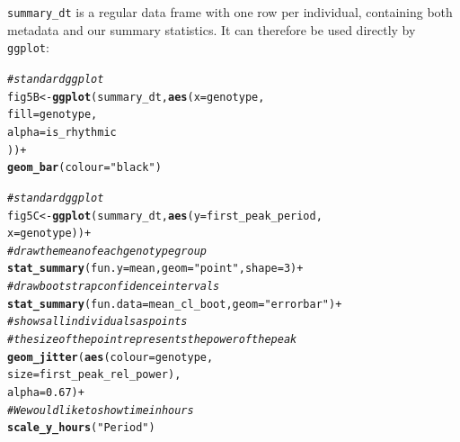 \documentclass[10pt,letterpaper]{article}\usepackage[]{graphicx}\usepackage[]{color}
\makeatletter
\newcommand{\hlnum}[1]{\textcolor[rgb]{0.686,0.059,0.569}{#1}}%
\newcommand{\hlstr}[1]{\textcolor[rgb]{0.192,0.494,0.8}{#1}}%
\newcommand{\hlcom}[1]{\textcolor[rgb]{0.678,0.584,0.686}{\textit{#1}}}%
\newcommand{\hlopt}[1]{\textcolor[rgb]{0,0,0}{#1}}%
\newcommand{\hlstd}[1]{\textcolor[rgb]{0.345,0.345,0.345}{#1}}%
\newcommand{\hlkwb}[1]{\textcolor[rgb]{0.69,0.353,0.396}{#1}}%
\newcommand{\hlkwc}[1]{\textcolor[rgb]{0.333,0.667,0.333}{#1}}%
\newcommand{\hlkwd}[1]{\textcolor[rgb]{0.737,0.353,0.396}{\textbf{#1}}}%
\newenvironment{kframe}{%
 \def\at@end@of@kframe{}%
 \ifinner\ifhmode%
  \def\at@end@of@kframe{\end{minipage}}%
  \begin{minipage}{\columnwidth}%
 \fi\fi%
 \def\FrameCommand##1{\hskip\@totalleftmargin \hskip-\fboxsep
 \colorbox{shadecolor}{##1}\hskip-\fboxsep
     \hskip-\linewidth \hskip-\@totalleftmargin \hskip\columnwidth}%
 \MakeFramed {\advance\hsize-\width
   \@totalleftmargin\z@ \linewidth\hsize
   \@setminipage}}%
 {\par\unskip\endMakeFramed%
 \at@end@of@kframe}
\newenvironment{knitrout}{}{} %
\makeatother
\begin{document}
\texttt{summary\_dt} is a regular data frame with one row per individual, containing both metadata and our summary statistics. 
It can therefore be used directly by \texttt{ggplot}:

\begin{knitrout}
\color{fgcolor}\begin{kframe}
\begin{alltt}
\hlcom{# standard ggplot}
\hlstd{fig5B} \hlkwb{<-} \hlkwd{ggplot}\hlstd{(summary_dt,} \hlkwd{aes}\hlstd{(}\hlkwc{x} \hlstd{= genotype,}
                                \hlkwc{fill} \hlstd{= genotype,}
                                \hlkwc{alpha} \hlstd{= is_rhythmic}
                                \hlstd{))} \hlopt{+}
              \hlkwd{geom_bar}\hlstd{(}\hlkwc{colour}\hlstd{=}\hlstr{"black"}\hlstd{)}
\end{alltt}
\end{kframe}
\end{knitrout}

\begin{knitrout}
\color{fgcolor}\begin{kframe}
\begin{alltt}
\hlcom{# standard ggplot}
\hlstd{fig5C} \hlkwb{<-} \hlkwd{ggplot}\hlstd{(summary_dt,} \hlkwd{aes}\hlstd{(}\hlkwc{y} \hlstd{= first_peak_period,}
                                \hlkwc{x} \hlstd{= genotype))} \hlopt{+}
              \hlcom{# draw the mean of each genotype group}
              \hlkwd{stat_summary}\hlstd{(}\hlkwc{fun.y} \hlstd{= mean,} \hlkwc{geom} \hlstd{=} \hlstr{"point"}\hlstd{,} \hlkwc{shape}\hlstd{=}\hlnum{3}\hlstd{)} \hlopt{+}
              \hlcom{# draw bootstrap confidence intervals}
              \hlkwd{stat_summary}\hlstd{(}\hlkwc{fun.data} \hlstd{= mean_cl_boot,} \hlkwc{geom} \hlstd{=} \hlstr{"errorbar"}\hlstd{)} \hlopt{+}
              \hlcom{# shows all individuals as points}
              \hlcom{# the size of the point represents the power of the peak}
              \hlkwd{geom_jitter}\hlstd{(}\hlkwd{aes}\hlstd{(}\hlkwc{colour} \hlstd{= genotype,}
                              \hlkwc{size} \hlstd{= first_peak_rel_power),}
                              \hlkwc{alpha} \hlstd{=} \hlnum{0.67}\hlstd{)} \hlopt{+}
              \hlcom{# We would like to show time in hours}
              \hlkwd{scale_y_hours}\hlstd{(}\hlstr{"Period"}\hlstd{)}
\end{alltt}
\end{kframe}
\end{knitrout}
\end{document}
